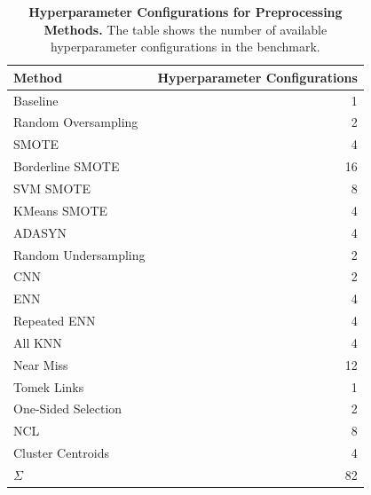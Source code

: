 \documentclass[conference]{IEEEtran}
\begin{document}
\begin{table}[ht]
    \centering
    \begin{tabular}{lr}
        Method & Hyperparameter Configurations \\
        \midrule
        Baseline & 1 \\
        Random Oversampling & 2 \\
        SMOTE & 4 \\
        Borderline SMOTE & 16 \\
        SVM SMOTE & 8 \\
        KMeans SMOTE & 4 \\
        ADASYN & 4 \\
        Random Undersampling & 2 \\
        CNN & 2 \\
        ENN & 4 \\
        Repeated ENN & 4 \\
        All KNN & 4 \\
        Near Miss & 12 \\
        Tomek Links & 1 \\
        One-Sided Selection & 2 \\
        NCL & 8 \\
        Cluster Centroids & 4 \\
        \midrule
        $\Sigma$ & 82 \\
    \end{tabular}

    \vspace{4mm}

    \caption{
        \textbf{Hyperparameter Configurations for Preprocessing Methods.} The table shows the
        number of available hyperparameter configurations in the benchmark.
    }
    \label{table:configs}
\end{table}
\end{document}
